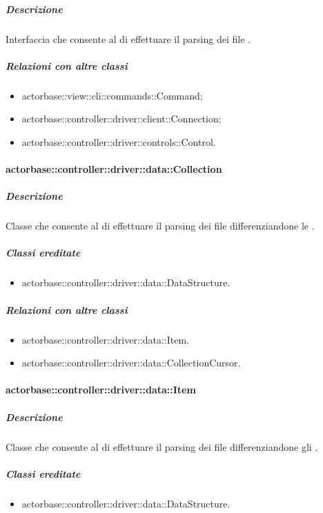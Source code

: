 \documentclass{scalatekids-article}
\begin{document}
\subparagraph{Descrizione}

Interfaccia che consente al  di effettuare il parsing dei file .

\subparagraph{Relazioni con altre classi}

\begin{itemize}
\item actorbase::view::cli::commands::Command;
\item actorbase::controller::driver::client::Connection;
\item actorbase::controller::driver::controls::Control.
\end{itemize}

\paragraph{actorbase::controller::driver::data::Collection}

\subparagraph{Descrizione}

Classe che consente al  di effettuare il parsing dei file  differenziandone le .

\subparagraph{Classi ereditate}

\begin{itemize}
\item actorbase::controller::driver::data::DataStructure.
\end{itemize}

\subparagraph{Relazioni con altre classi}

\begin{itemize}
\item actorbase::controller::driver::data::Item.
\item actorbase::controller::driver::data::CollectionCursor.
\end{itemize}

\paragraph{actorbase::controller::driver::data::Item}

\subparagraph{Descrizione}

Classe che consente al  di effettuare il parsing dei file  differenziandone gli .

\subparagraph{Classi ereditate}

\begin{itemize}
\item actorbase::controller::driver::data::DataStructure.
\end{itemize}
\end{document}
